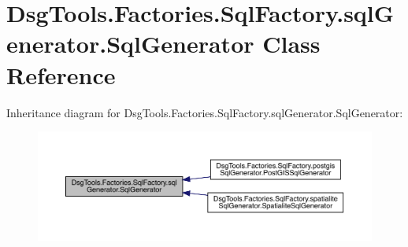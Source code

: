 \hypertarget{class_dsg_tools_1_1_factories_1_1_sql_factory_1_1sql_generator_1_1_sql_generator}{}\section{Dsg\+Tools.\+Factories.\+Sql\+Factory.\+sql\+Generator.\+Sql\+Generator Class Reference}
\label{class_dsg_tools_1_1_factories_1_1_sql_factory_1_1sql_generator_1_1_sql_generator}


Inheritance diagram for Dsg\+Tools.\+Factories.\+Sql\+Factory.\+sql\+Generator.\+Sql\+Generator\+:
\nopagebreak
\begin{figure}[H]
\begin{center}
\leavevmode
\includegraphics[width=350pt]{class_dsg_tools_1_1_factories_1_1_sql_factory_1_1sql_generator_1_1_sql_generator__inherit__graph}
\end{center}
\end{figure}
